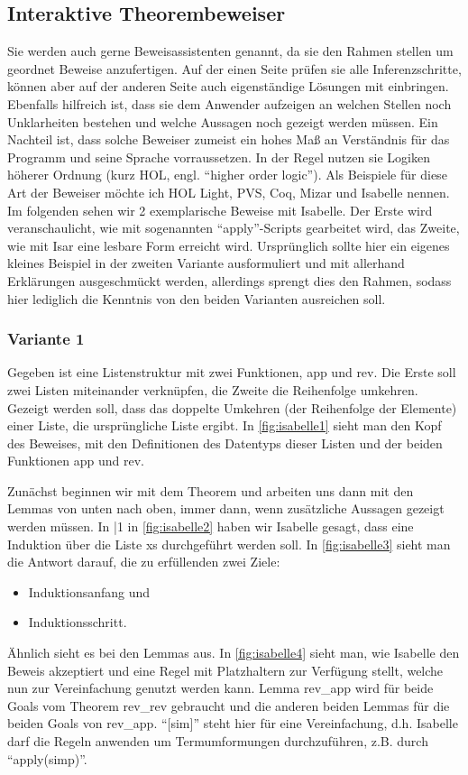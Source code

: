 \subsection{Interaktive Theorembeweiser}
Sie werden auch gerne Beweisassistenten genannt, da sie den Rahmen stellen um geordnet Beweise anzufertigen. Auf der einen Seite prüfen sie alle Inferenzschritte, können aber auf der anderen Seite auch eigenständige Lösungen mit einbringen. Ebenfalls hilfreich ist, dass sie dem Anwender aufzeigen an welchen Stellen noch Unklarheiten bestehen und welche Aussagen noch gezeigt werden müssen. Ein Nachteil ist, dass solche Beweiser zumeist ein hohes Maß an Verständnis für das Programm und seine Sprache vorraussetzen. In der Regel nutzen sie Logiken höherer Ordnung (kurz HOL, engl. \enquote{higher order logic}). Als Beispiele für diese Art der Beweiser möchte ich HOL Light, PVS, Coq, Mizar und Isabelle nennen.
Im folgenden sehen wir 2 exemplarische Beweise mit Isabelle. Der Erste wird veranschaulicht, wie mit sogenannten \enquote{apply}-Scripts gearbeitet wird, das Zweite, wie mit Isar eine lesbare Form erreicht wird.
Ursprünglich sollte hier ein eigenes kleines Beispiel in der zweiten Variante ausformuliert und mit allerhand Erklärungen ausgeschmückt werden, allerdings sprengt dies den Rahmen, sodass hier lediglich die Kenntnis von den beiden Varianten ausreichen soll.

\subsubsection*{Variante 1}
Gegeben ist eine Listenstruktur mit zwei Funktionen, app und rev. Die Erste soll zwei Listen miteinander verknüpfen, die Zweite die
Reihenfolge umkehren.
Gezeigt werden soll, dass das doppelte Umkehren (der Reihenfolge der Elemente) einer Liste, die ursprüngliche Liste ergibt.
In \cref{fig:isabelle1} sieht man den Kopf des Beweises, mit den Definitionen des Datentyps dieser Listen und der beiden Funktionen app und rev.

Zunächst beginnen wir mit dem Theorem und arbeiten uns dann mit den Lemmas von unten nach oben, immer dann, wenn zusätzliche Aussagen gezeigt werden müssen.
In |1 in \cref{fig:isabelle2} haben wir Isabelle gesagt, dass eine Induktion über die Liste xs durchgeführt werden soll. In \cref{fig:isabelle3} sieht man die Antwort darauf, die zu erfüllenden zwei Ziele:
\begin{itemize}
\item Induktionsanfang und
\item Induktionsschritt.
\end{itemize}
Ähnlich sieht es bei den Lemmas aus.
In \cref{fig:isabelle4} sieht man, wie Isabelle den Beweis akzeptiert und eine Regel mit Platzhaltern zur Verfügung stellt, welche nun zur
Vereinfachung genutzt werden kann.
Lemma rev\_app wird für beide Goals vom Theorem rev\_rev gebraucht und die anderen beiden Lemmas für die beiden Goals von rev\_app. \enquote{[sim]} steht hier für eine Vereinfachung, d.h. Isabelle darf die Regeln anwenden um Termumformungen durchzuführen, z.B. durch \enquote{apply(simp)}.

